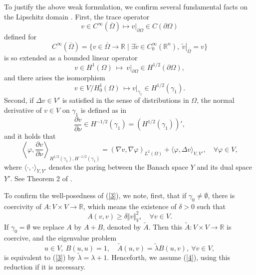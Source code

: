 \documentclass[final,a4paper]{jmsj}
\newcommand{\R}{\mathbb R}
\theoremstyle{thmstyleone}%
\theoremstyle{thmstyletwo}%
\theoremstyle{thmstylethree}%
\begin{document}
To justify the above weak formulation, we confirm several fundamental facts on the Lipschitz domain \cite{kjf77}. First, the trace operator 
\[ v\in C^\infty(\overline{\Omega})\mapsto \left. v\right\vert_{\partial\Omega} \in C(\partial\Omega) \] 
defined for 
\[ C^\infty(\overline{\Omega})=\{ v\in \overline{\Omega} \rightarrow \R \mid \exists \tilde v\in C_0^\infty(\R^n), \ \left. \tilde v\right\vert_{\overline{\Omega}}=v \} \] 
is so extended as a bounded linear operator    
\[ v\in H^1(\Omega) \ \mapsto \ \left. v\right\vert_{\partial\Omega}\in H^{1/2}(\partial\Omega), \]  
and there arises the isomorphism 
\[ v\in V/H^1_0(\Omega) \ \mapsto \left. v\right\vert_{\gamma_1}\in H^{1/2}(\gamma_1). \] 
Second, if $\Delta v\in V'$ is satisfied in the sense of distributions in $\Omega$, the normal derivative of $v\in V$ on $\gamma_1$ is defined as in   
\[ \frac{\partial v}{\partial \nu}\in H^{-1/2}(\gamma_1)=(H^{1/2}(\gamma_1))', \] 
and it holds that   
\[ \left\langle \varphi, \frac{\partial v}{\partial \nu}\right\rangle_{H^{1/2}(\gamma_1), H^{-1/2}(\gamma_1)}=(\nabla v, \nabla\varphi)_{L^2(\Omega)}+\langle \varphi, \Delta v\rangle_{V, V'}, \quad \forall \varphi\in V,  \] 
where $\langle \cdot, \cdot \rangle_{Y,Y'}$ denotes the paring between the Banach space $Y$ and its dual space $Y'$. See Theorem 2 of \cite{st22}. 

To confirm the well-posedness of (\ref{3}), we note, first, that 
if $\gamma_0\neq\emptyset$, there is coercivity of $A:V\times V\rightarrow \R$, which means the existence of $\delta>0$ such that  
\begin{equation} 
A(v,v)\geq \delta \Vert v\Vert_V^2, \quad \forall v\in V. 
 \label{4}
\end{equation} 
If $\gamma_0=\emptyset$ we replace $A$ by $A+B$, denoted by $\tilde A$. Then this $\tilde A:V\times V\rightarrow \R$ is coercive, and the eigenvalue problem 
\[ u\in V, \ B(u,u)=1, \quad \tilde A(u,v)=\tilde \lambda B(u,v), \ \forall v\in V, \] 
is equivalent to (\ref{3}) by $\tilde \lambda=\lambda+1$.  Henceforth, we assume (\ref{4}), using this  reduction if it is necessary. 
\end{document}
